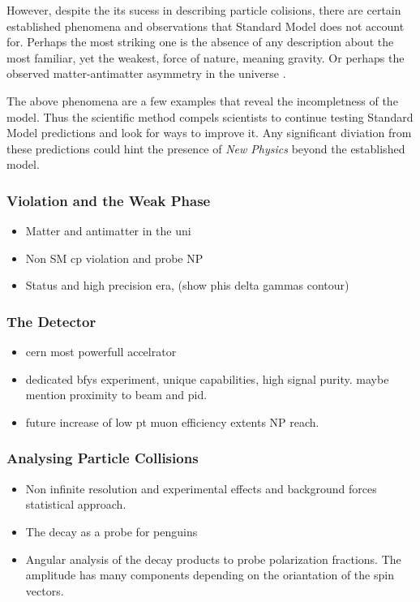 However, despite the its sucess in describing particle colisions, there are certain
established phenomena and observations that Standard Model does not account for.
Perhaps the most striking one is the absence of any description about the most familiar,
yet the weakest, force of nature, meaning gravity. Or perhaps the observed matter-antimatter
asymmetry in the universe \cite{more-cpv-huet,more-cpv-gavela_I,more-cpv-gavela_II}.

The above phenomena are a few examples that reveal the incompletness of the model.
Thus the scientific method compels scientists to continue testing Standard Model predictions
and look for ways to improve it. Any significant diviation from these predictions could
hint the presence of {\it New Physics} beyond the established model.

\subsubsection{\CP Violation and the Weak Phase \phis}

\begin{itemize}
\item Matter and antimatter in the uni
\item Non SM cp violation and probe NP
\item Status and high precision era, (show phis delta gammas contour)
\end{itemize}

\subsubsection{The \lhcb Detector}

\begin{itemize}
\item \lhc cern most powerfull accelrator
\item \lhcb dedicated bfys experiment, unique capabilities, high signal purity. maybe mention proximity to beam and pid.
\item future increase of low pt muon efficiency extents NP reach.
\end{itemize}

\subsubsection{Analysing Particle Collisions}

\begin{itemize}
\item Non infinite resolution and experimental effects and background forces statistical approach.
\item The \BsJpsiKst decay as a probe for penguins
\item Angular analysis of the decay products to probe polarization fractions. The amplitude has many
      components depending on the oriantation of the spin vectors.
\end{itemize}

